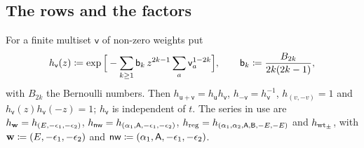 \subsection{The rows and the factors}
\label{sec:set-rows}

For a finite multiset $\mathsf{v}$ of non-zero weights put
\begin{equation}
\label{eq:set-h}
h_{\mathsf{v}}(z)\coloneqq\exp\Big[-\sum_{k\geq1}\mathsf{b}_k\,z^{2k-1}\sum_{a}\mathsf{v}_a^{1-2k}\Big],\qquad \mathsf{b}_k\coloneqq\frac{B_{2k}}{2k(2k-1)},
\end{equation}
with $B_{2k}$ the Bernoulli numbers. Then $h_{\mathsf{u}+\mathsf{v}}=h_{\mathsf{u}}h_{\mathsf{v}}$, $h_{-\mathsf{v}}=h_{\mathsf{v}}^{-1}$, $h_{(v,-v)}=1$ and $h_{\mathsf{v}}(z)h_{\mathsf{v}}(-z)=1$; $h_{\mathsf{v}}$ is independent of $t$. The series in use are $h_{\mathbf{w}}=h_{(E,-\epsilon_1,-\epsilon_2)}$, $h_{\mathsf{nw}}=h_{(\alpha_1,\mathsf{A},-\epsilon_1,-\epsilon_2)}$, $h_{\mathrm{reg}}=h_{(\alpha_1,\alpha_2,\mathsf{A},\mathsf{B},-E,-E)}$ and $h_{\mathrm{wt}_\pm}$, with $\mathbf{w}\coloneqq(E,-\epsilon_1,-\epsilon_2)$ and $\mathsf{nw}\coloneqq(\alpha_1,\mathsf{A},-\epsilon_1,-\epsilon_2)$.

